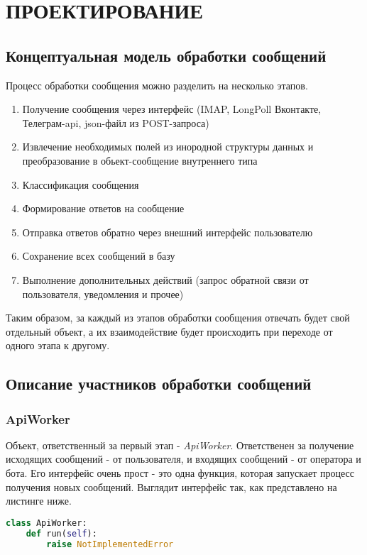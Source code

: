 \section{ПРОЕКТИРОВАНИЕ}
    \subsection{Концептуальная модель обработки сообщений}
    Процесс обработки сообщения можно разделить на несколько этапов.
    \begin{enumerate}
        \item Получение сообщения через интерфейс (IMAP, LongPoll Вконтакте, Телеграм-api, json-файл из POST-запроса)
        \item Извлечение необходимых полей из инородной структуры данных и преобразование в обьект-сообщение внутреннего типа
        \item Классификация сообщения
        \item Формирование ответов на сообщение
        \item Отправка ответов обратно через внешний интерфейс пользователю
        \item Сохранение всех сообщений в базу
        \item Выполнение дополнительных действий (запрос обратной связи от пользователя, уведомления и прочее)
    \end{enumerate}

    Таким образом, за каждый из этапов обработки сообщения отвечать будет свой отдельный объект,
    а их взаимодействие будет происходить при переходе от одного этапа к другому.
    
    \subsection{Описание участников обработки сообщений}
    \subsubsection*{ApiWorker}
    Объект, ответственный за первый этап - \textit{ApiWorker}. Ответственен за получение
    исходящих сообщений - от пользователя, и входящих сообщений - от оператора и бота.
    Его интерфейс очень прост - это одна функция, которая запускает процесс получения новых сообщений.
    Выглядит интерфейс так, как представлено на листинге ниже.
\begin{lstlisting}[language=Python]
class ApiWorker:
    def run(self):
        raise NotImplementedError
\end{lstlisting}

